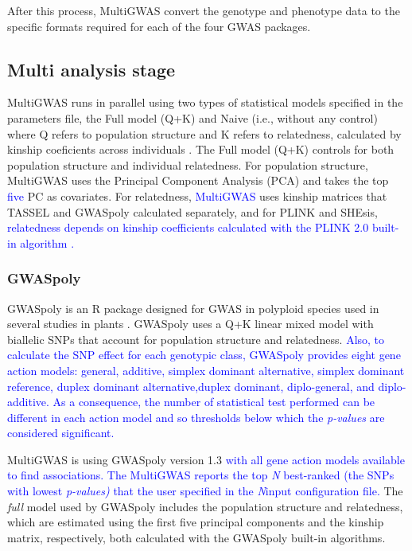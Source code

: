\documentclass{article}
\begin{document}
After this process, MultiGWAS convert the genotype and phenotype data to the specific formats required for each of the four GWAS packages.

\subsection{Multi analysis stage}
MultiGWAS runs in parallel using two types of statistical models specified in the parameters file, the Full model (Q+K) and Naive (i.e., without any control) where Q refers to population structure and K refers to relatedness, calculated by kinship coeficients across individuals \cite{Sharma2018}. The Full model (Q+K) controls for both population structure and individual relatedness. For population structure, MultiGWAS uses the Principal Component Analysis (PCA) and takes the top \textcolor{blue}{five} PC as covariates. For relatedness, \textcolor{blue}{MultiGWAS} uses kinship matrices that TASSEL and GWASpoly calculated separately, and for PLINK and SHEsis, \textcolor{blue}{relatedness depends on kinship coefficients calculated with the PLINK 2.0 built-in algorithm \cite{Chang2015}. }

\subsubsection{GWASpoly}
GWASpoly \cite{Rosyara2016} is an R package designed for GWAS in polyploid species used in several studies in plants \cite{Berdugo2017,Ferrao2018,Sharma2018,Yuan2019}. GWASpoly uses a Q+K linear mixed model with biallelic SNPs that account for population structure and relatedness. \textcolor{blue}{Also, to calculate the SNP effect for each genotypic class, GWASpoly provides eight gene action models: general, additive, simplex dominant alternative, simplex dominant reference, duplex dominant alternative,duplex dominant, diplo-general, and diplo-additive. As a consequence, the number of statistical test performed can be different in each action model and so thresholds below which the }\textcolor{blue}{\emph{p-values}}\textcolor{blue}{{} are considered significant.}

MultiGWAS is using GWASpoly version 1.3 \textcolor{blue}{with all gene action models available to find associations. The MultiGWAS reports the top }\textcolor{blue}{\emph{N }}\textcolor{blue}{best-ranked (the SNPs with lowest }\textcolor{blue}{\emph{p-values)}}\textcolor{blue}{  that the user specified in the  }\textcolor{blue}{\emph{N}}\textcolor{blue}{{}input configuration file.} The \emph{full }model used by GWASpoly includes the population structure and relatedness, which are estimated using the first five principal components and the kinship matrix, respectively, both calculated with the GWASpoly built-in algorithms.
\end{document}
